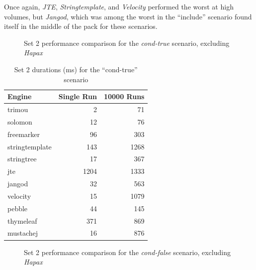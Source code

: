 Once again, \emph{JTE}, \emph{Stringtemplate}, and \emph{Velocity} performed the worst at high volumes, but \emph{Jangod}, which was among the worst in the \enquote{include} scenario found itself in the middle of the pack for these scenarios.

\begin{figure}[!p]
\centering

\caption{\label{multi:set2-true}Set 2 performance comparison for the \emph{cond-true} scenario, excluding \emph{Hapax}}
\end{figure}

\begin{table}[!p]
\centering
\begin{tabular}{lrr}
\textbf{Engine} & \textbf{Single Run} & \textbf{10000 Runs} \\
\hline
trimou & 2 & 71 \\
solomon & 12 & 76 \\
freemarker & 96 & 303 \\
stringtemplate & 143 & 1268 \\
stringtree & 17 & 367 \\
jte & 1204 & 1333 \\
jangod & 32 & 563 \\
velocity & 15 & 1079 \\
pebble & 44 & 145 \\
thymeleaf & 371 & 869 \\
mustachej & 16 & 876 \\
\end{tabular}
\caption{Set 2 durations (ms) for the \enquote{cond-true} scenario\label{w2:results:cond-true}}
\end{table}

\begin{figure}[!p]
\centering

\caption{\label{multi:set2-false}Set 2 performance comparison for the \emph{cond-false} scenario, excluding \emph{Hapax}}
\end{figure}

